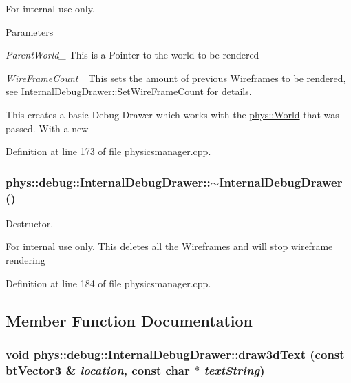 \begin{DoxyInternal}{For internal use only.}

\begin{DoxyParams}{Parameters}
\item[{\em ParentWorld\_\-}]This is a Pointer to the world to be rendered \item[{\em WireFrameCount\_\-}]This sets the amount of previous Wireframes to be rendered, see \hyperlink{classphys_1_1debug_1_1InternalDebugDrawer_a76922fda7bb3b59d301e50d67e4f3c72}{InternalDebugDrawer::SetWireFrameCount} for details.\end{DoxyParams}
This creates a basic Debug Drawer which works with the \hyperlink{classphys_1_1World}{phys::World} that was passed. With a new \end{DoxyInternal}


Definition at line 173 of file physicsmanager.cpp.

\hypertarget{classphys_1_1debug_1_1InternalDebugDrawer_a9b5cb5ec48541effddb305de12508323}{
\subsubsection[{$\sim$InternalDebugDrawer}]{\setlength{\rightskip}{0pt plus 5cm}phys::debug::InternalDebugDrawer::$\sim$InternalDebugDrawer ()}}
\label{db/d27/classphys_1_1debug_1_1InternalDebugDrawer_a9b5cb5ec48541effddb305de12508323}


Destructor. 

\begin{DoxyInternal}{For internal use only.}
This deletes all the Wireframes and will stop wireframe rendering \end{DoxyInternal}


Definition at line 184 of file physicsmanager.cpp.



\subsection{Member Function Documentation}
\hypertarget{classphys_1_1debug_1_1InternalDebugDrawer_a1266d3fad8868ade2d515e9c92e76b4a}{
\subsubsection[{draw3dText}]{\setlength{\rightskip}{0pt plus 5cm}void phys::debug::InternalDebugDrawer::draw3dText (const btVector3 \& {\em location}, \/  const char $\ast$ {\em textString})}}
\label{db/d27/classphys_1_1debug_1_1InternalDebugDrawer_a1266d3fad8868ade2d515e9c92e76b4a}


